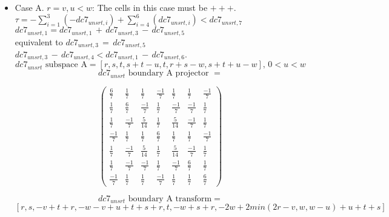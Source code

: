 \documentclass[preprint]{iucr}              %
\begin{document}
{\begin{itemize}
     \item{Case A. $r=v, u < w$:  The cells in this case must be $+++$.\\
     $\tau=-\sum_{i=1}^3(-dc7_{unsrt,i})+\sum_{i=4}^6(dc7_{unsrt,i}) < dc7_{unsrt,7}$\\
     $dc7_{unsrt,1}=dc7_{unsrt,1}\,+\,dc7_{unsrt,3}\,-\,dc7_{unsrt,5}$\\
          equivalent to
     $dc7_{unsrt,3}\,=\,dc7_{unsrt,5}$\\
     $dc7_{unsrt,3}\,-\,dc7_{unsrt,4} <
     dc7_{unsrt,1}\,-\,dc7_{unsrt,6}$.
     \[dc7_{unsrt} \text{ subspace A}=[r,s,t,s+t-u,t,r+s-w,s+t+u-w],\, 0 < u < w \]
     \[dc7_{unsrt} \text{ boundary A projector } =\]
\begin{center}
\begin{equation*}
\begin{pmatrix}
\frac{6}{7}&\frac{1}{7}&\frac{1}{7}&\frac{-1}{7}&\frac{1}{7}&\frac{1}{7}&\frac{-1}{7}\\[.25em]
\frac{1}{7}&\frac{6}{7}&\frac{-1}{7}&\frac{1}{7}&\frac{-1}{7}&\frac{-1}{7}&\frac{1}{7}\\[.25em]
\frac{1}{7}&\frac{-1}{7}&\frac{5}{14}&\frac{1}{7}&\frac{5}{14}&\frac{-1}{7}&\frac{1}{7}\\[.25em]
\frac{-1}{7}&\frac{1}{7}&\frac{1}{7}&\frac{6}{7}&\frac{1}{7}&\frac{1}{7}&\frac{-1}{7}\\[.25em]
\frac{1}{7}&\frac{-1}{7}&\frac{5}{14}&\frac{1}{7}&\frac{5}{14}&\frac{-1}{7}&\frac{1}{7}\\[.25em]
\frac{1}{7}&\frac{-1}{7}&\frac{-1}{7}&\frac{1}{7}&\frac{-1}{7}&\frac{6}{7}&\frac{1}{7}\\[.25em]
\frac{-1}{7}&\frac{1}{7}&\frac{1}{7}&\frac{-1}{7}&\frac{1}{7}&\frac{1}{7}&\frac{6}{7}
\end{pmatrix}
\end{equation*}
\end{center}


\[dc7_{unsrt} \text{ boundary A transform}=\]
\[[r,s,-v+t+r,-w-v+u+t+s+r,t,-w+s+r,-2 w+2 min(2r-v,w,w-u)+u+t+s]\]
     }
     

\end{itemize}}
\end{document}
